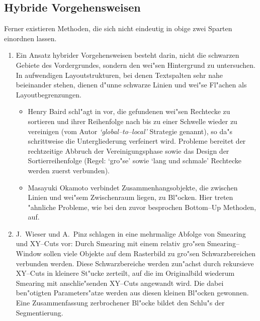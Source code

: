 \subsection{Hybride Vorgehensweisen}

Ferner existieren Methoden, die sich nicht eindeutig in obige zwei Sparten einordnen lassen.
\begin{enumerate}
  \item
        Ein Ansatz hybrider Vorgehensweisen besteht darin, nicht die schwarzen Gebiete des Vordergrundes,
        sondern den wei"sen Hintergrund zu untersuchen. In aufwendigen Layout\-strukturen, bei denen Textspalten sehr nahe beieinander stehen, dienen d"unne schwarze Linien und wei"se Fl"achen als Layoutbegrenzungen.

        \begin{itemize}
          \item Henry Baird schl"agt in \cite{Baird92} vor, die gefundenen wei"sen Rechtecke zu sortieren und
                ihrer Reihenfolge nach bis zu einer Schwelle wieder zu vereinigen (vom Autor {\em
                    `global--to--local'} Strategie genannt), so da"s schrittweise die Untergliederung verfeinert
                wird. Probleme bereitet der rechtzeitige Abbruch der
                Vereinigungsphase sowie das Design der Sortierreihenfolge
                (Regel: `gro"se' sowie `lang und schmale' Rechtecke werden zuerst verbunden).

          \item Masayuki Okamoto \cite{Okamoto93} verbindet Zusammenhangsobjekte, die zwischen Linien
                und wei"sem Zwischenraum liegen, zu Bl"ocken. Hier treten "ahnliche Probleme, wie bei den
                zuvor besprochen Bottom--Up Methoden, auf.
        \end{itemize}

  \item
        J.~Wieser und A.~Pinz schlagen in \cite{Wieser93} eine mehrmalige Abfolge von Smearing und XY--Cuts vor:
        Durch Smearing mit einem relativ gro"sen Smearing--Window sollen viele Objekte auf dem Rasterbild
        zu gro"sen Schwarzbereichen verbunden werden. Diese Schwarzbereiche werden zun"achst durch
        rekursieve XY--Cuts in kleinere St"ucke zerteilt, auf die im Originalbild wiederum Smearing mit
        anschlie"senden XY--Cuts angewandt wird. Die dabei ben"otigten Parameters"atze werden aus diesen
        kleinen Bl"ocken gewonnen.
        Eine Zusammenfassung zerbrochener Bl"ocke bildet den Schlu"s der Segmentierung.


\end{enumerate}

